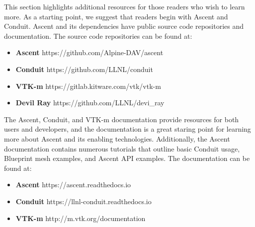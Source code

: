 This section highlights additional resources for those readers who
wish to learn more.
%
As a starting point, we suggest that readers begin with Ascent and
Conduit.
%
Ascent and its dependencies have public source code repositories and
documentation.
%
The source code repositories can be found at:
\begin{itemize}
  \item \textbf{Ascent} https://github.com/Alpine-DAV/ascent
  \item \textbf{Conduit} https://github.com/LLNL/conduit
  \item \textbf{VTK-m} https://gitlab.kitware.com/vtk/vtk-m
  \item \textbf{Devil Ray} https://github.com/LLNL/devi\_ray
\end{itemize}

The Ascent, Conduit, and VTK-m documentation provide resources for both users and
developers, and the documentation is a great staring point for learning more about
Ascent and its enabling technologies.
%
Additionally, the Ascent documentation contains numerous tutorials that
outline basic Conduit usage, Blueprint mesh examples, and Ascent API examples.
The documentation can be found at:
\begin{itemize}
  \item \textbf{Ascent} https://ascent.readthedocs.io
  \item \textbf{Conduit} https://llnl-conduit.readthedocs.io
  \item \textbf{VTK-m} http://m.vtk.org/documentation
\end{itemize}
